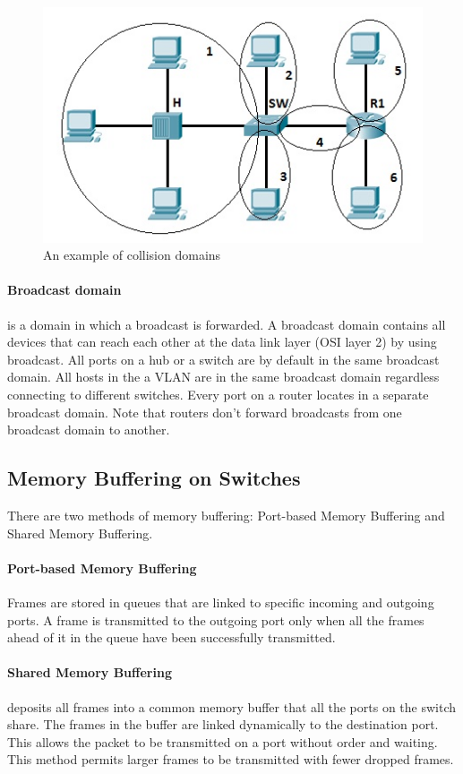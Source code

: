 \begin{figure}[hbtp]
\caption{An example of collision domains}
\centering
\includegraphics[scale=0.8]{pictures/CollisionDomains.jpg}
\end{figure}

\paragraph{Broadcast domain}is a domain in which a broadcast is forwarded. A broadcast domain contains all devices that can reach each other at the data link layer (OSI layer 2) by using broadcast. All ports on a hub or a switch are by default in the same broadcast domain. All hosts in the a VLAN are in the same broadcast domain regardless connecting to different switches. Every port on a router locates in a separate broadcast domain. Note that routers don't forward broadcasts from one broadcast domain to another.


\subsection{Memory Buffering on Switches}

There are two methods of memory buffering: Port-based Memory Buffering and Shared Memory Buffering.

\paragraph{Port-based Memory Buffering} Frames are stored in queues that are linked to specific incoming and outgoing ports. A frame is transmitted to the outgoing port only when all the frames ahead of it in the queue have been successfully transmitted. 

\paragraph{Shared Memory Buffering} deposits all frames into a common memory buffer that all the ports on the switch share.  The frames in the buffer are linked dynamically to the destination port. This allows the packet to be transmitted on a port without order and waiting. This method permits larger frames to be transmitted with fewer dropped frames. 

